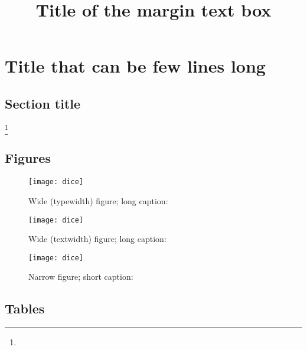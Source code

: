 \documentclass{enisareport}
\theoremstyle{plain}
\theoremstyle{definition}
\begin{document}
\chapter{Title that can be few lines long}\label{chap2}

\section{Section title}\label{sec21}



{%
  \title{Title of the margin text box}
  \lipsum[2][1-3]
}

\lipsum[1]\footnote{\lipsum[1][2]} \lipsum[2-4]

\clearpage

\section{Figures}

\lipsum[1]
%
%
\begin{figure*}
  \caption{Wide (typewidth) figure; long caption: \lipsum[4]}
  \texttt{[image: dice]}
\end{figure*}
%
%
\begin{figure}
  \caption{Wide (textwidth) figure; long caption: \lipsum[4][1]}
  \texttt{[image: dice]}
\end{figure}
%
%
\begin{figure}
  \caption{Narrow figure; short caption: \lipsum[4][1]}
  \texttt{[image: dice]}
\end{figure}

\clearpage

\section{Tables}%
\label{sec:tabs}
\end{document}

